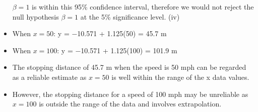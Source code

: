 \documentclass[a4paper,12pt]{article}
\begin{document}
\begin{itemize}

$\beta = 1$ is within this 95\% confidence interval, therefore we would not reject the
null hypothesis $\beta = 1$ at the 5\% significance level.
(iv)
\item When $x = 50$: y = −10.571 + 1.125(50) = 45.7 m
\item When $x = 100$: y = −10.571 + 1.125(100) = 101.9 m
\item The stopping distance of 45.7 m when the speed is 50 mph can be regarded as a reliable estimate as $x = 50$ is well within the range of the x data values.
\item However, the stopping distance for a speed of 100 mph may be unreliable as $x = 100$ is outside the range of the data and involves extrapolation.
\end{itemize}
\end{document}
